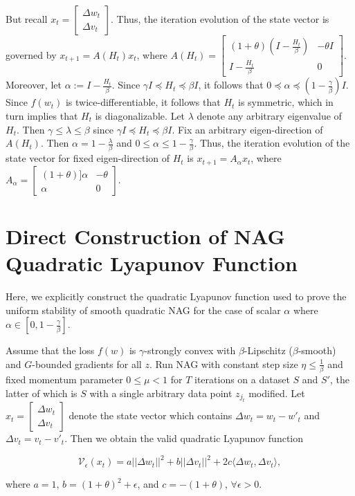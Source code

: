 \documentclass[twoside,11pt]{article}
\begin{document}
\noindent
But recall $x_t = \begin{bmatrix}
    \Delta w_t \\
    \Delta v_t
\end{bmatrix}$. Thus, the iteration evolution of the state vector is governed by $x_{t+1} = A(H_t) x_t$, where $A(H_t) = \begin{bmatrix}
    (1+\theta)(I-\frac{H_t}{\beta}) & -\theta I \\
    I - \frac{H_t}{\beta} & 0    
\end{bmatrix}$. Moreover, let $\alpha := I - \frac{H_t}{\beta}$. Since $\gamma I \preceq H_t \preceq \beta I$, it follows that $0 \preceq \alpha \preceq (1 - \frac{\gamma}{\beta})I$. Since $f(w_t)$ is twice-differentiable, it follows that $H_t$ is symmetric, which in turn implies that $H_t$ is diagonalizable. Let $\lambda$ denote any arbitrary eigenvalue of $H_t$. Then $\gamma \leq \lambda \leq \beta$ since $\gamma I \preceq H_t \preceq \beta I$. Fix an arbitrary eigen-direction of $A(H_t)$. Then $\alpha = 1 - \frac{\lambda}{\beta}$ and $0 \leq \alpha \leq 1 - \frac{\gamma}{\beta}$. Thus, the iteration evolution of the state vector for fixed eigen-direction of $H_t$ is $x_{t+1} = A_{\alpha}x_t$, where $A_\alpha = \begin{bmatrix}
    (1+\theta)]\alpha & -\theta \\
    \alpha & 0
\end{bmatrix}$.

\section{Direct Construction of NAG Quadratic Lyapunov Function}

Here, we explicitly construct the quadratic Lyapunov function used to prove the uniform stability of smooth quadratic NAG for the case of scalar $\alpha$ where $\alpha \in [0, 1 - \frac{\gamma}{\beta}]$.

\begin{theorem}
Assume that the loss $f(w)$ is $\gamma$-strongly convex with $\beta$-Lipschitz ($\beta$-smooth) and $G$-bounded gradients for all $z$. Run NAG with constant step size $\eta \leq \frac{1}{\beta}$ and fixed momentum parameter $0 \leq \mu < 1$ for $T$ iterations on a dataset $S$ and $S'$, the latter of which is $S$ with a single arbitrary data point $z_{j_t}$ modified. Let $x_t = \begin{bmatrix}
    \Delta w_t \\
    \Delta v_t
\end{bmatrix}$  denote the state vector which contains $\Delta w_t = w_t - w'_t$ and $\Delta v_t = v_t - v'_t$. Then we obtain the valid quadratic Lyapunov function 

\begin{equation}
\mathcal{V}_{\epsilon}(x_{t}) = a||\Delta w_{t}||^2 + b ||\Delta v_{t}||^2 + 2c\langle \Delta w_{t}, \Delta v_{t} \rangle, 
\end{equation}

\noindent
where $a = 1$, $b=(1+\theta)^2 + \epsilon$, and $c = -(1+\theta)$, $\forall \epsilon > 0$.
\end{theorem}
\end{document}

